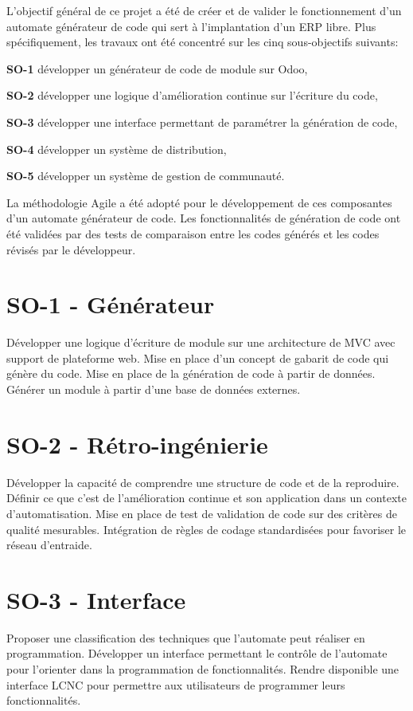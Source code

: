 \label{sec:Theme1} \label{chapitre_methode}

L’objectif général de ce projet a été de créer et de valider le fonctionnement d’un automate générateur de code qui sert à l’implantation d’un ERP libre. Plus spécifiquement, les travaux ont été concentré sur les cinq sous-objectifs suivants:

\textbf{SO-1} développer un générateur de code de module sur Odoo,

\textbf{SO-2} développer une logique d'amélioration continue sur l'écriture du code,

\textbf{SO-3} développer une interface permettant de paramétrer la génération de code,

\textbf{SO-4} développer un système de distribution,

\textbf{SO-5} développer un système de gestion de communauté.

La méthodologie Agile a été adopté pour le développement de ces composantes d'un automate générateur de code. Les fonctionnalités de génération de code ont été validées par des tests de comparaison entre les codes générés et les codes révisés par le développeur.


\section{SO-1 - Générateur}
Développer une logique d’écriture de module sur une architecture de MVC avec support de plateforme web. Mise en place d’un concept de gabarit de code qui génère du code. Mise en place de la génération de code à partir de données. Générer un module à partir d’une base de données externes.

\section{SO-2 - Rétro-ingénierie}
Développer la capacité de comprendre une structure de code et de la reproduire. Définir ce que c’est de l’amélioration continue et son application dans un contexte d’automatisation. Mise en place de test de validation de code sur des critères de qualité mesurables. Intégration de règles de codage standardisées pour favoriser le réseau d’entraide.

\section{SO-3 - Interface}
Proposer une classification des techniques que l’automate peut réaliser en programmation. Développer un interface permettant le contrôle de l’automate pour l’orienter dans la programmation de fonctionnalités. Rendre disponible une interface LCNC pour permettre aux utilisateurs de programmer leurs fonctionnalités.

